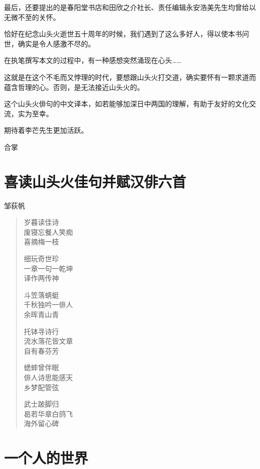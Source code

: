 {  最后，还要提出的是春阳堂书店和田欣之介社长、责任编辑永安浩美先生均曾给以无微不至的关怀。

  恰好在纪念山头火逝世五十周年的时候，我们遇到了这么多好人，得以使本书问世，确实是令人感激不尽的。

  在执笔撰写本文的过程中，有一种感想突然涌现在心头……

  这就是在这个不毛而又悖理的时代，要想跟山头火打交道，确实要怀有一颗求道而蕴含哲理的心。否则，是无法接近山头火的。

  这个山头火俳句的中文译本，如若能够加深日中两国的理解，有助于友好的文化交流，实为至幸。

  期待着李芒先生更加活跃。

  \bigskip

  \hfill 合掌
 }

\chapter{\FK 喜读山头火佳句并赋汉俳六首}

 {\FS \hfill 邹荻帆

  \begin{quote}
      岁暮读佳诗\\
      废寝忘餐人笑痴\\
      喜摘梅一枝

      细玩奇世珍\\
      一章一句一乾坤\\
      译作两传神

      斗笠落蜻蜓\\
      千秋独吟一俳人\\
      余晖青山青

      托钵寻诗行\\
      流水落花皆文章\\
      自有春芬芳

      蟋蟀曾伴眠\\
      俳人诗思能感天\\
      乡梦配管弦

      武士跛脚归\\
      曷若华章白鸽飞\\
      海外留心碑
  \end{quote}
 }

\chapter{\FK 一个人的世界}

